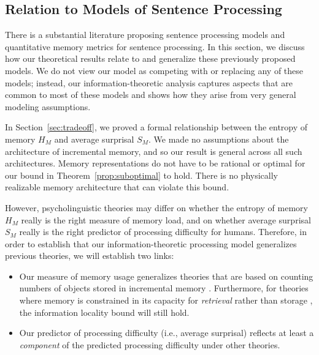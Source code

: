 \subsection{Relation to Models of Sentence Processing}
\label{sec:sentprod-models}

There is a substantial literature proposing sentence processing models and quantitative memory metrics for sentence processing.
In this section, we discuss how our theoretical results relate to and generalize these previously proposed models.
We do not view our model as competing with or replacing any of these models; instead, our information-theoretic analysis captures aspects that are common to most of these models and shows how they arise from very general modeling assumptions. 

In Section~\ref{sec:tradeoff}, we proved a formal relationship between the entropy of memory $H_M$ and average surprisal $S_M$. 
We made no assumptions about the architecture of incremental memory, and so our result is general across all such architectures.
Memory representations do not have to be rational or optimal for our bound in Theorem~\ref{prop:suboptimal} to hold.
There is no physically realizable memory architecture that can violate this bound.

However, psycholinguistic theories may differ on whether the entropy of memory $H_M$ really is the right measure of memory load, and on whether average surprisal $S_M$ really is the right predictor of processing difficulty for humans. Therefore, in order to establish that our information-theoretic processing model generalizes previous theories, we will establish two links:
\begin{itemize}
    \item Our measure of memory usage generalizes theories that are based on counting numbers of objects stored in incremental memory \citep[e.g.,][]{yngve1960model,miller-finitary-1963,frazier1985syntactic,gibson-linguistic-1998,kobele2013memory,graf2014evaluating,GrafEtAl15MOL,gerth2015memory,GrafEtAl17JLM,desanto2020parsing}. Furthermore, for theories where memory is constrained in its capacity for \emph{retrieval} rather than storage \citep[e.g.,][]{mcelree-memory-2003,lewis-activation-based-2005}, the information locality bound will still hold.
    \item Our predictor of processing difficulty (i.e., average surprisal) reflects at least a \emph{component} of the predicted processing difficulty under other theories.
\end{itemize}

